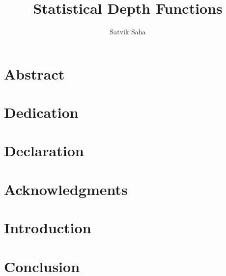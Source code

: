 \documentclass[12pt]{report}
\title{Statistical Depth Functions}
\author{Satvik Saha}
\date{}
\begin{document}
    


    \chapter*{Abstract}


    \chapter*{Dedication}


    \chapter*{Declaration}


    \chapter*{Acknowledgments}


    \tableofcontents


    \chapter{Introduction}
    


    \chapter{Conclusion}
    


    \nocite{*}
    \printbibliography

    \appendix
\end{document}
